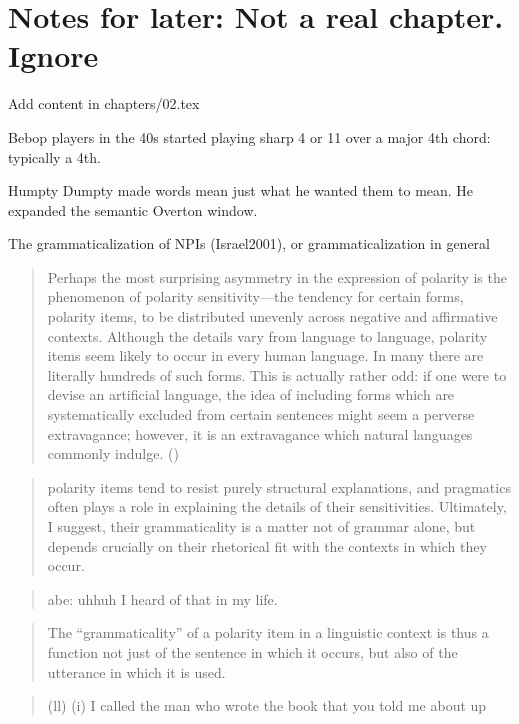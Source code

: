 \chapter{Notes for later: Not a real chapter. Ignore}
Add content in chapters/02.tex

Bebop players in the 40s started playing sharp 4 or 11 over a major 4th chord: typically a 4th.

Humpty Dumpty made words mean just what he wanted them to mean. He expanded the semantic Overton window.

The grammaticalization of NPIs (Israel2001), or grammaticalization in general

\begin{quote}
    Perhaps the most surprising asymmetry in the expression of polarity is the phenomenon of polarity sensitivity—the tendency for certain forms, polarity items, to be distributed unevenly across negative and affirmative contexts. Although the details vary from language to language, polarity items seem likely to occur in every human language. In many there are literally hundreds of such forms. This is actually rather odd: if one were to devise an artificial language, the idea of including forms which are systematically excluded from certain sentences might seem a perverse extravagance; however, it is an extravagance which natural languages commonly indulge. (\cite[11]{Israel2004})
\end{quote}
\begin{quote}
    polarity items tend to resist purely structural explanations, and pragmatics often plays a role in explaining the details of their sensitivities. Ultimately, I suggest, their grammaticality is a matter not of grammar alone, but depends crucially on their rhetorical fit with the contexts in which they occur.\cite[13]{Israel2004}
\end{quote}

\begin{quote}
    abe: uhhuh I heard of that in my life. \cite[5]{Israel2011}
\end{quote}

\begin{quote}
    The “grammaticality” of a polarity item in a linguistic context is thus a function not just of the sentence in which it occurs, but also of the utterance in which it is used.\cite[9]{Israel2011}
\end{quote}

\begin{quote}
    (ll) (i) I called the man who wrote the book that you told me about up \cite[11]{Chomsky1965}
\end{quote}

